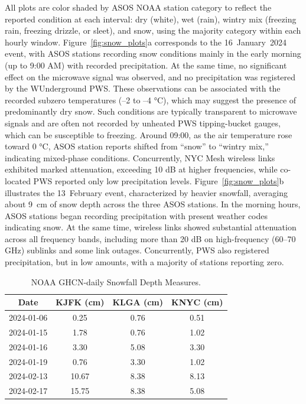 \documentclass[manuscript]{copernicus}
\begin{document}
All plots are color shaded by ASOS NOAA station category to reflect the reported condition at each interval: dry (white), wet (rain), wintry mix (freezing rain, freezing drizzle,  or sleet), and snow, using the majority category within each hourly window. 
Figure~\ref{fig:snow_plots}a corresponds to the 16~January~2024 event, with ASOS stations recording snow conditions mainly in the early morning (up to 9:00 AM) with recorded precipitation.
At the same time, no significant effect on the microwave signal was observed, and no precipitation was registered by the WUnderground PWS. These observations can be associated with the recorded subzero temperatures (–2 to –4 °C), which may suggest the presence of predominantly dry snow. Such conditions are typically transparent to microwave signals and are often not recorded by unheated PWS tipping-bucket gauges, which can be susceptible to freezing.
Around 09:00, as the air temperature rose toward 0 °C, ASOS station reports shifted from “snow” to “wintry mix,” indicating mixed-phase conditions. Concurrently, NYC Mesh wireless links exhibited marked attenuation, exceeding 10 dB at higher frequencies, while co-located PWS reported only low precipitation levels.
Figure~\ref{fig:snow_plots}b illustrates the 13~February event, characterized by heavier snowfall, averaging about 9~cm of snow depth across the three ASOS stations.
In the morning hours, ASOS stations began recording precipitation with present weather codes indicating snow. At the same time, wireless links showed substantial attenuation across all frequency bands, including more than 20 dB on high-frequency (60–70 GHz) sublinks and some link outages. Concurrently, PWS also registered precipitation, but in low amounts, with a majority of stations reporting zero.
\begin{table}[h]
\centering
\caption{NOAA GHCN-daily Snowfall Depth Measures. }

\begin{tabular}{|c|c|c|c|}
\hline
\textbf{Date}   & \textbf{KJFK (cm)} & \textbf{KLGA (cm)} & \textbf{KNYC (cm)} \\ \hline
2024-01-06      & 0.25               & 0.76               & 0.51               \\ \hline
2024-01-15      & 1.78               & 0.76               & 1.02               \\ \hline
2024-01-16      & 3.30               & 5.08               & 3.30               \\ \hline
2024-01-19      & 0.76               & 3.30               & 1.02               \\ \hline
2024-02-13      & 10.67              & 8.38               & 8.13               \\ \hline
2024-02-17      & 15.75              & 8.38               & 5.08               \\ \hline
\end{tabular} \label{table:snowfall_data}
\end{table} 
\end{document}
